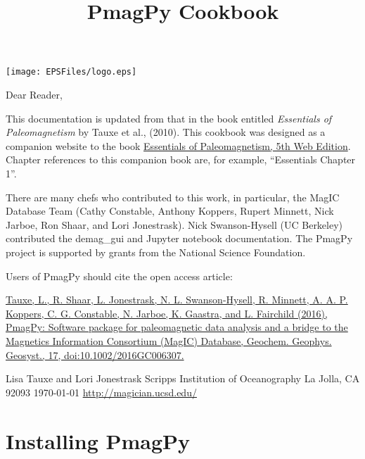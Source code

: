 \documentclass[11pt]{book}
\begin{document}
 \setcounter{tocdepth}{3}
\tableofcontents


{\hskip 1in \texttt{[image: EPSFiles/logo.eps]}

 \title{PmagPy Cookbook}

 \maketitle
\noindent Dear Reader,

This documentation is updated from that in the book entitled {\it Essentials of Paleomagnetism} by  Tauxe et al., (2010). \nocite{tauxe10}  This cookbook was designed as a companion website to the book \href{http://earthref.org/MAGIC/books/Tauxe/Essentials/WebBook3.html}{Essentials of Paleomagnetism, 5th Web Edition}. Chapter references to this companion book are, for example, ``Essentials Chapter 1''.

There are many chefs who contributed to this work, in particular, the MagIC Database Team (Cathy Constable, Anthony Koppers, Rupert Minnett, Nick Jarboe, Ron Shaar, and Lori Jonestrask). Nick Swanson-Hysell (UC Berkeley) contributed the demag\_gui and Jupyter notebook documentation. The PmagPy project is supported by grants from the National Science Foundation.


Users of PmagPy should cite the open access article:

  \href{http://dx.doi.org/10.1002/2016GC006307}{Tauxe, L., R. Shaar, L. Jonestrask,
N. L. Swanson-Hysell, R. Minnett,
A. A. P. Koppers, C. G. Constable,
N. Jarboe, K. Gaastra, and L. Fairchild
(2016), PmagPy: Software package for
paleomagnetic data analysis and a
bridge to the Magnetics Information
Consortium (MagIC) Database,
Geochem. Geophys. Geosyst., 17,
doi:10.1002/2016GC006307.}

{\obeylines
 Lisa Tauxe and Lori Jonestrask
 Scripps Institution of Oceanography
 La Jolla, CA 92093
 \today
  \url{http://magician.ucsd.edu/}
 }



\chapter{Installing {\bf PmagPy}}

}
\end{document}
